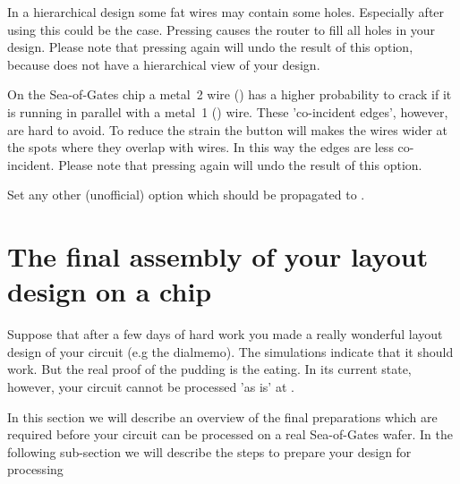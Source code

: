 \begin{description}
In a hierarchical design some fat wires may contain some
holes. Especially after using  this could
be the case.  Pressing  causes the
router to fill all holes in your design. Please note that
pressing  again will undo the result of this
option, because  does not have a hierarchical
view of your design.
\item[\button{overlap wires}] 
On the Sea-of-Gates chip a metal~2 wire () has a
higher probability to crack if it is running in parallel
with a metal~1 () wire. These 'co-incident edges',
however, are hard to avoid. To reduce the strain the button
 will makes the  wires wider
at the spots where they overlap with  wires. In
this way the edges are less co-incident.  Please note that
pressing  again will undo the result of this
option.
\item[\button{options}]
Set any other (unofficial) option which should be
propagated to .
\end{description}

\section{The final assembly of your layout design on a chip}
Suppose that after a few days of hard work you made a really wonderful layout
design of your circuit (e.g the dialmemo). The simulations indicate that it
should work.  But the real proof of the pudding is the eating.  In its current
state, however, your circuit cannot be processed 'as is' at .

In this section we will describe an overview of the final preparations which
are required before your circuit can be processed on a real Sea-of-Gates wafer.
In the following sub-section we will describe the steps to prepare your design
for processing

